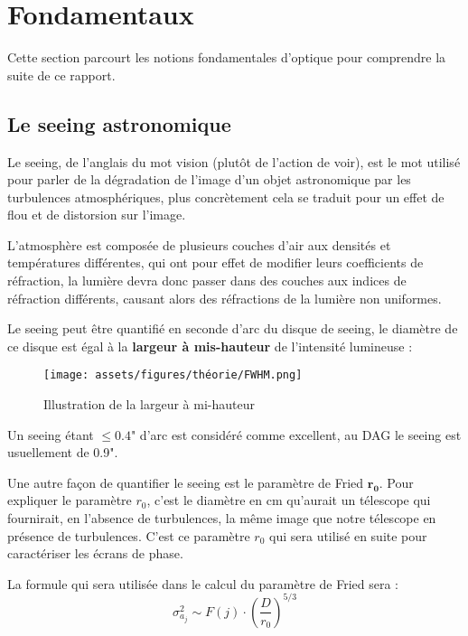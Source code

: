 \section{Fondamentaux}
Cette section parcourt les notions fondamentales d'optique pour comprendre la suite de ce rapport.

\subsection{Le seeing astronomique}
Le seeing, de l'anglais du mot vision (plutôt de l'action de voir), est le mot utilisé pour parler de la dégradation de l'image
d'un objet astronomique par les turbulences atmosphériques, plus concrètement cela se traduit pour un effet de flou et de distorsion sur l'image.

L'atmosphère est composée de plusieurs couches d'air aux densités et températures différentes, qui ont pour effet de modifier leurs coefficients de réfraction, la lumière devra donc passer
dans des couches aux indices de réfraction différents, causant alors des réfractions de la lumière non uniformes.

Le seeing peut être quantifié en seconde d'arc du disque de seeing, le diamètre de ce disque est égal à la \textbf{largeur à mis-hauteur} de l'intensité lumineuse :
\begin{figure}[H]
  \centering
  \texttt{[image: assets/figures/théorie/FWHM.png]}
  \caption[Illustration de la LMH]{Illustration de la largeur à mi-hauteur \autocite{largeur_mis_hauteur}\footnotemark}\label{fig:largeur_mis_hauteur}
\end{figure}

Un seeing étant $\leq  0.4$" d'arc est considéré comme excellent, au DAG le seeing est usuellement de 0.9".

Une autre façon de quantifier le seeing est le paramètre de Fried $\mathbf{r_0}$. Pour expliquer le paramètre $r_0$, c'est le diamètre en cm qu'aurait un télescope
qui fournirait, en l'absence de turbulences, la même image que notre télescope en présence de turbulences. C'est ce paramètre $r_0$ qui sera utilisé en suite pour caractériser les écrans de phase.

La formule qui sera utilisée dans le calcul du paramètre de Fried sera :
\begin{equation}
  \sigma_{a_j}^2 \sim F(j) \cdot (\frac{D}{r_0})^{5/3} \label{eq:param_fried}
\end{equation}

